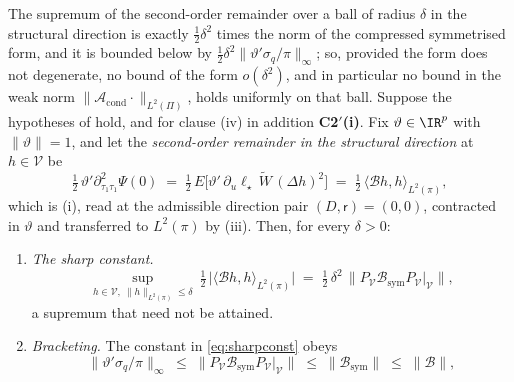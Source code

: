 \begin{proposition}\label{prp:sharpquad}
The supremum of the second-order remainder over a ball of radius $\delta$ in the structural direction is
exactly $\tfrac12\delta^{2}$ times the norm of the compressed symmetrised form, and it is bounded below by
$\tfrac12\delta^{2}\|\vartheta'\sigma_q/\pi\|_\infty$; so, provided the form does not degenerate, no bound
of the form $o(\delta^{2})$, and in particular no bound in the weak norm
$\|\mathcal A_{\mathrm{cond}}\cdot\|_{L^{2}(\Pi)}$, holds uniformly on that ball.
Suppose the hypotheses of  hold, and for clause \textup{(iv)} in addition
\textbf{C2$'$(i)}. Fix $\vartheta\in\IR^{p}$ with $\|\vartheta\|=1$,
and let the \emph{second-order remainder in the structural direction} at $h\in\mathcal V$ be
\begin{equation}\label{eq:quadrem}
\tfrac12\,\vartheta'\partial^{2}_{\tau_1\tau_1}\Psi(0)
\;=\;\tfrac12\,E\big[\vartheta'\,\partial_u\ell_\star\,\widetilde W\,(\Delta h)^{2}\big]
\;=\;\tfrac12\,\big\langle\mathcal Bh,h\big\rangle_{L^{2}(\pi)} ,
\end{equation}
which is \textup{(i)}, read at the admissible direction pair
$(D,\mathsf r)=(0,0)$, contracted in $\vartheta$ and transferred to $L^{2}(\pi)$ by
\textup{(iii)}.
Then, for every $\delta>0$:
\begin{enumerate}
\item[(i)] \emph{The sharp constant.}
\begin{equation}\label{eq:sharpconst}
\sup_{h\in\mathcal V,\ \|h\|_{L^{2}(\pi)}\le\delta}\ \tfrac12\,\big|\big\langle\mathcal Bh,h\big\rangle_{L^{2}(\pi)}\big|
\;=\;\tfrac12\,\delta^{2}\,\big\|P_{\mathcal V}\mathcal B_{\mathrm{sym}}P_{\mathcal V}|_{\mathcal V}\big\| ,
\end{equation}
a supremum that need not be attained.
\item[(ii)] \emph{Bracketing.} The constant in \eqref{eq:sharpconst} obeys
\begin{equation}\label{eq:bracket}
\big\|\vartheta'\sigma_q/\pi\big\|_\infty
\;\le\;\big\|P_{\mathcal V}\mathcal B_{\mathrm{sym}}P_{\mathcal V}|_{\mathcal V}\big\|
\;\le\;\big\|\mathcal B_{\mathrm{sym}}\big\|\;\le\;\big\|\mathcal B\big\| ,

\end{equation}
\end{enumerate}
\end{proposition}

